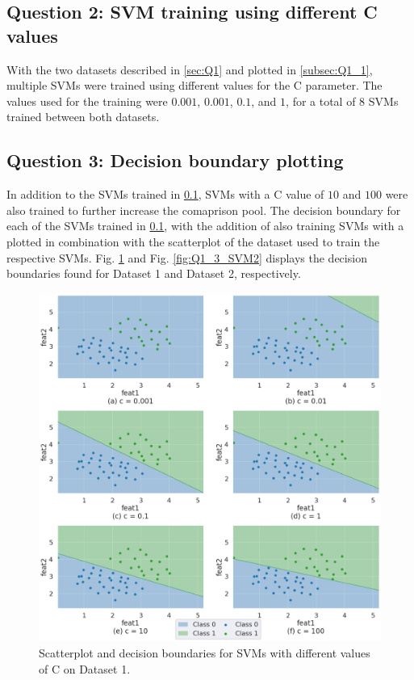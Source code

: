 \documentclass{article}
\begin{document}
\subsection{Question 2: SVM training using different C values}
\label{subsec:Q1_2}
With the two datasets described in \ref{sec:Q1} and plotted in \ref{subsec:Q1_1}, multiple SVMs were trained using different values for the C parameter. The values used for the training were $0.001$, $0.001$, $0.1$, and $1$, for a total of 8 SVMs trained between both datasets. 

\subsection{Question 3: Decision boundary plotting}
\label{subsec:Q1_3}
In addition to the SVMs trained in \ref{subsec:Q1_2}, SVMs with a C value of $10$ and $100$ were also trained to further increase the comaprison pool.  The decision boundary for each of the SVMs trained in \ref{subsec:Q1_2}, with the addition of also training SVMs with a  plotted in combination with the scatterplot of the dataset used to train the respective SVMs. Fig. \ref{fig:Q1_3_SVM1} and Fig. \ref{fig:Q1_3_SVM2} displays the decision boundaries found for Dataset 1 and Dataset 2, respectively.

\begin{figure}[tb]
    \centering
    \includegraphics[width=\linewidth]{Img/Q1/Q1_3_SVM1.png}
    \caption{Scatterplot and decision boundaries for SVMs with different values of C on Dataset 1.}
    \label{fig:Q1_3_SVM1}
\end{figure}
\end{document}
